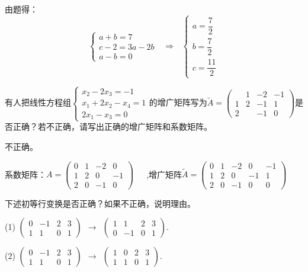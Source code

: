 \documentclass[a4paper]{report}
\begin{document}
\begin{jie}
由题得：
\begin{equation*}
\begin{cases}
a+b=7\\
c-2=3a-2b\\
a-b=0
\end{cases}~~~\Rightarrow~~~
\begin{cases}
a=\dfrac{7}{2}\\
b=\dfrac{7}{2}\\
c=\dfrac{11}{2}
\end{cases}
\end{equation*}
\end{jie}

\EX 有人把线性方程组$
\begin{cases}
x_2-2x_3=-1\\
x_1+2x_2-x_4=1\\
2x_1-x_3=0
\end{cases}
$的增广矩阵写为$
\widetilde{A} =
\begin{pmatrix}
&1&-2&-1\\ 1 &2 &-1&1\\ 2&&-1&0
\end{pmatrix}
$是否正确？若不正确，请写出正确的增广矩阵和系数矩阵。

\begin{jie}
不正确。

系数矩阵：$
A =
\begin{pmatrix}
0&1&-2&0\\ 1 &2 &0&-1\\ 2&0&-1&0
\end{pmatrix}$~~~,增广矩阵$
\widetilde{A} =
\begin{pmatrix}
0&1&-2&0&-1\\ 1 &2 &0&-1&1\\ 2&0&-1&0&0
\end{pmatrix}$
\end{jie}

\EX 下述初等行变换是否正确？如果不正确，说明理由。

(1)
$
\begin{pmatrix}
0&-1&2&3\\ 1&1 &0&1
\end{pmatrix}~~\rightarrow~~
\begin{pmatrix}
1&1&2&3\\ 0&-1 &0&1
\end{pmatrix}
$.

(2)
$
\begin{pmatrix}
0&-1&2&3\\ 1&1 &0&1
\end{pmatrix}~~\rightarrow~~
\begin{pmatrix}
1&0&2&3\\ 1&1 &0&1
\end{pmatrix}
$.
\end{document}
